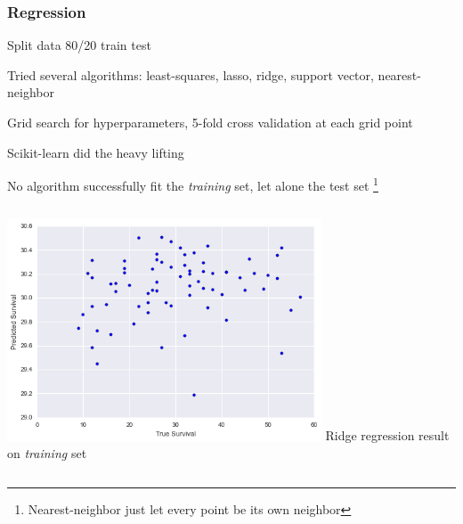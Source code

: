 \documentclass[10pt,professionalfonts,xcolor=table]{beamer}
\begin{document}
\begin{frame}
\frametitle{Regression}
\bangon
\item Split data 80/20 train test
\gap
\item Tried several algorithms: least-squares, lasso, ridge, support vector, nearest-neighbor
\gap
\item Grid search for hyperparameters, 5-fold cross validation at each grid point
  \bangon
  \item Scikit-learn did the heavy lifting
  \bangoff
\gap
\item No algorithm successfully fit the \textit{training} set, let alone the test set \footnote{Nearest-neighbor just let every point be its own neighbor}
\bangoff
\vspace{-10pt}
\begin{columns}[c]
\flushright
   \includegraphics[width=0.7\textwidth]{figures/ridge_reg.png}
\centering
 Ridge regression result on \textit{training} set
\end{columns}
\end{frame}
\end{document}
